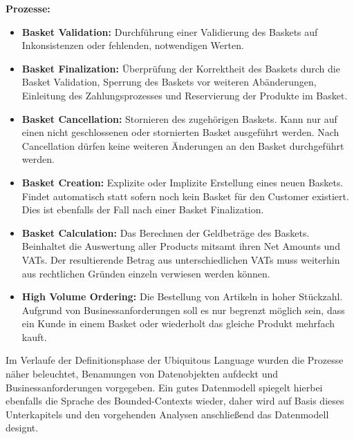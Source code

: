 {\large \textbf{Prozesse:}}
\begin{itemize}[noitemsep,nolistsep]
	\item \textbf{Basket Validation: } {Durchführung einer Validierung des Baskets auf Inkonsistenzen oder fehlenden, notwendigen Werten.}
	\item \textbf{Basket Finalization: } {Überprüfung der Korrektheit des Baskets durch die Basket Validation, Sperrung des Baskets vor weiteren Abänderungen, Einleitung des Zahlungsprozesses und Reservierung der Produkte im Basket. }
	\item \textbf{Basket Cancellation: } {Stornieren des zugehörigen Baskets. Kann nur auf einen nicht geschlossenen oder stornierten Basket ausgeführt werden. Nach Cancellation dürfen keine weiteren Änderungen an den Basket durchgeführt werden. }
	\item \textbf{Basket Creation: } {Explizite oder Implizite Erstellung eines neuen Baskets. Findet automatisch statt sofern noch kein Basket für den Customer existiert. Dies ist ebenfalls der Fall nach einer Basket Finalization.}
	\item \textbf{Basket Calculation: } {Das Berechnen der Geldbeträge des Baskets. Beinhaltet die Auswertung aller Products mitsamt ihren Net Amounts und VATs. Der resultierende Betrag aus unterschiedlichen VATs muss weiterhin aus rechtlichen Gründen einzeln verwiesen werden können.}
	\item \textbf{High Volume Ordering: } {Die Bestellung von Artikeln in hoher Stückzahl. Aufgrund von Businessanforderungen soll es nur begrenzt möglich sein, dass ein Kunde in einem Basket oder wiederholt das gleiche Produkt mehrfach kauft.}
\end{itemize}
\vspace{0.4em}


Im Verlaufe der Definitionsphase der Ubiquitous Language wurden die Prozesse näher beleuchtet, Benamungen von Datenobjekten aufdeckt und Businessanforderungen vorgegeben. Ein gutes Datenmodell spiegelt hierbei ebenfalls die Sprache des Bounded-Contexts wieder, daher wird auf Basis dieses Unterkapitels und den vorgehenden Analysen anschließend das Datenmodell designt. 

